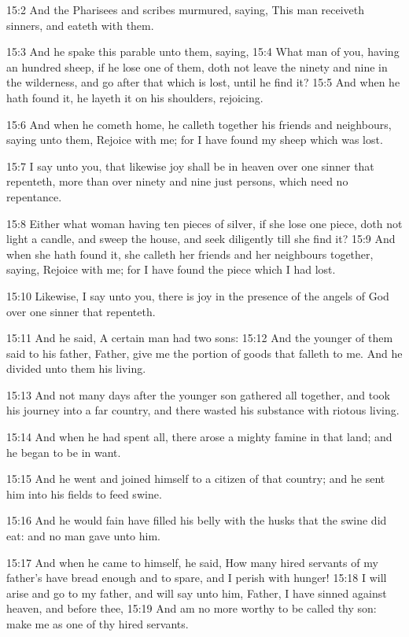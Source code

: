 15:2 And the Pharisees and scribes murmured, saying, This man
receiveth sinners, and eateth with them.

15:3 And he spake this parable unto them, saying, 15:4 What man of
you, having an hundred sheep, if he lose one of them, doth not leave
the ninety and nine in the wilderness, and go after that which is
lost, until he find it?  15:5 And when he hath found it, he layeth it
on his shoulders, rejoicing.

15:6 And when he cometh home, he calleth together his friends and
neighbours, saying unto them, Rejoice with me; for I have found my
sheep which was lost.

15:7 I say unto you, that likewise joy shall be in heaven over one
sinner that repenteth, more than over ninety and nine just persons,
which need no repentance.

15:8 Either what woman having ten pieces of silver, if she lose one
piece, doth not light a candle, and sweep the house, and seek
diligently till she find it?  15:9 And when she hath found it, she
calleth her friends and her neighbours together, saying, Rejoice with
me; for I have found the piece which I had lost.

15:10 Likewise, I say unto you, there is joy in the presence of the
angels of God over one sinner that repenteth.

15:11 And he said, A certain man had two sons: 15:12 And the younger
of them said to his father, Father, give me the portion of goods that
falleth to me. And he divided unto them his living.

15:13 And not many days after the younger son gathered all together,
and took his journey into a far country, and there wasted his
substance with riotous living.

15:14 And when he had spent all, there arose a mighty famine in that
land; and he began to be in want.

15:15 And he went and joined himself to a citizen of that country; and
he sent him into his fields to feed swine.

15:16 And he would fain have filled his belly with the husks that the
swine did eat: and no man gave unto him.

15:17 And when he came to himself, he said, How many hired servants of
my father's have bread enough and to spare, and I perish with hunger!
15:18 I will arise and go to my father, and will say unto him, Father,
I have sinned against heaven, and before thee, 15:19 And am no more
worthy to be called thy son: make me as one of thy hired servants.

